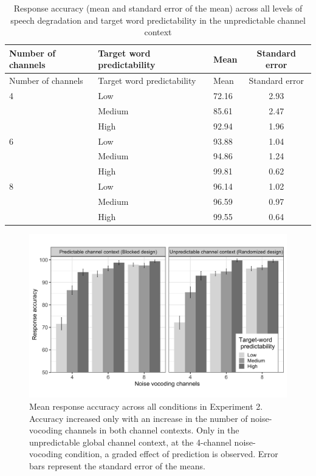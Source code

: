 \documentclass[a4paper, nobind]{templates/ociamthesis}
\begin{document}
\begin{longtable}[]{@{}lllc@{}}
\caption{Response accuracy (mean and standard error of the mean) across all levels of speech degradation and target word predictability in the unpredictable channel context}
\label{summaryunpredictable}
\tabularnewline
\toprule
Number of channels & Target word predictability & Mean & Standard
error \\
\midrule
\endfirsthead
\toprule
Number of channels & Target word predictability & Mean & Standard
error \\
\midrule
\endhead
4 & Low & 72.16 & 2.93 \\
& Medium & 85.61 & 2.47 \\
& High & 92.94 & 1.96 \\
6 & Low & 93.88 & 1.04 \\
& Medium & 94.86 & 1.24 \\
& High & 99.81 & 0.62 \\
8 & Low & 96.14 & 1.02 \\
& Medium & 96.59 & 0.97 \\
& High & 99.55 & 0.64 \\
\bottomrule
\end{longtable}

\begin{figure}

{\centering \includegraphics[width=0.95\linewidth]{figures/results-fig/expt-2} 

}

\caption{Mean response accuracy across all conditions in Experiment 2. Accuracy increased only with an increase in the number of noise-vocoding channels in both channel contexts. Only in the unpredictable global channel context, at the 4-channel noise-vocoding condition, a graded effect of prediction is observed. Error bars represent the standard error of the means.}\label{fig:figure2}
\end{figure}
\end{document}
